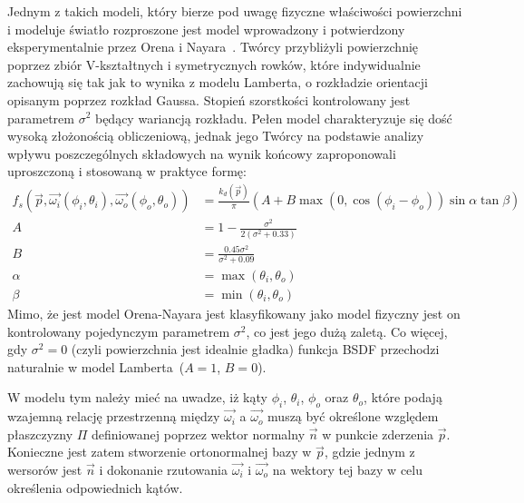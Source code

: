 Jednym z takich modeli, który bierze pod uwagę fizyczne właściwości powierzchni i modeluje światło rozproszone jest model wprowadzony i potwierdzony eksperymentalnie przez Orena i Nayara~\cite{Oren94generalizationof}\cite{Nayar95visualappearance}. Twórcy przybliżyli powierzchnię poprzez zbiór V-kształtnych i symetrycznych rowków, które indywidualnie zachowują się tak jak to wynika z modelu Lamberta, o rozkładzie orientacji opisanym poprzez rozkład Gaussa. Stopień szorstkości kontrolowany jest parametrem $\sigma^2$ będący wariancją rozkładu. Pełen model charakteryzuje się dość wysoką złożonością obliczeniową, jednak jego Twórcy na podstawie analizy wpływu poszczególnych składowych na wynik końcowy zaproponowali uproszczoną i stosowaną w praktyce formę:
\begin{align}
f_s(\vec{p}, \vec{\omega_i}(\phi_i, \theta_i), \vec{\omega_o}(\phi_o, \theta_o)) &= \frac{k_d(\vec{p})}{\pi}(A + B\max(0, \cos(\phi_i - \phi_o))\sin\alpha\tan\beta)\\
A &= 1 - \frac{\sigma^2}{2(\sigma^2 + 0.33)}\\
B &= \frac{0.45\sigma^2}{\sigma^2 + 0.09}\\
\alpha &= \max(\theta_i, \theta_o)\\
\beta &= \min(\theta_i, \theta_o)
\end{align}
Mimo, że jest model Orena-Nayara jest klasyfikowany jako model fizyczny jest on kontrolowany pojedynczym parametrem $\sigma^2$, co jest jego dużą zaletą. Co więcej, gdy $\sigma^2 = 0$ (czyli powierzchnia jest idealnie gładka) funkcja BSDF przechodzi naturalnie w model Lamberta~($A=1$, $B=0$). 

W modelu tym należy mieć na uwadze, iż kąty $\phi_i$, $\theta_i$, $\phi_o$ oraz $\theta_o$, które podają wzajemną relację przestrzenną między $\vec{\omega_i}$ a $\vec{\omega_o}$ muszą być określone względem płaszczyzny $\Pi$ definiowanej poprzez wektor normalny $\vec{n}$ w punkcie zderzenia $\vec{p}$. Konieczne jest zatem stworzenie ortonormalnej bazy w $\vec{p}$, gdzie jednym z wersorów jest $\vec{n}$ i dokonanie rzutowania $\vec{\omega_i}$ i $\vec{\omega_o}$ na wektory tej bazy w celu określenia odpowiednich kątów.

